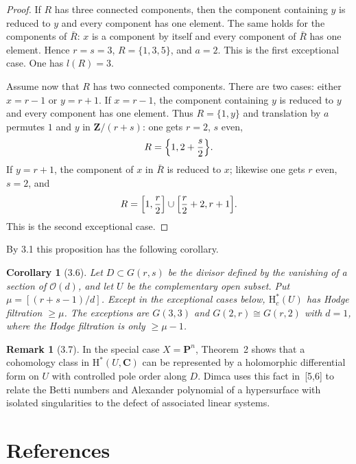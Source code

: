 \documentclass[11pt]{amsart}
\newtheorem{corollary}[theorem]{Corollary}
\theoremstyle{definition}
\newtheorem{remark}[theorem]{Remark}
\begin{document}
\begin{proof}
If $R$ has three connected components, then the component containing $y$ is reduced to $y$ and every component has one element. The same holds for the components of $\bar R$: $x$ is a component by itself and every component of $\bar R$ has one element. Hence $r=s=3$, $R=\{1,3,5\}$, and $a=2$. This is the first exceptional case. One has $l(R)=3$.

Assume now that $R$ has two connected components. There are two cases: either $x=r-1$ or $y=r+1$. If $x=r-1$, the component containing $y$ is reduced to $y$ and every component has one element. Thus $R=\{1,y\}$ and translation by $a$ permutes $1$ and $y$ in $\mathbf Z/(r+s)$: one gets $r=2$, $s$ even,
\[
R=\Bigl\{1, 2+\frac{s}{2}\Bigr\}.
\]
If $y=r+1$, the component of $x$ in $\bar R$ is reduced to $x$; likewise one gets $r$ even, $s=2$, and
\[
R=\Bigl[1,\frac r2\Bigr]\cup \Bigl[\frac r2+2, r+1\Bigr].
\]
This is the second exceptional case.
\end{proof}

By 3.1 this proposition has the following corollary.

\begin{corollary}[3.6]
Let $D\subset G(r,s)$ be the divisor defined by the vanishing of a section of $\mathscr O(d)$, and let $U$ be the complementary open subset. Put $\mu=[(r+s-1)/d]$. Except in the exceptional cases below, $\mathrm H_c^*(U)$ has Hodge filtration $\ge \mu$. The exceptions are $G(3,3)$ and $G(2,r)\cong G(r,2)$ with $d=1$, where the Hodge filtration is only $\ge \mu-1$.
\end{corollary}

\begin{remark}[3.7]
In the special case $X=\mathbf P^n$, Theorem~2 shows that a cohomology class in $\mathrm H^*(U,\mathbf C)$ can be represented by a holomorphic differential form on $U$ with controlled pole order along $D$. Dimca uses this fact in~[5,6] to relate the Betti numbers and Alexander polynomial of a hypersurface with isolated singularities to the defect of associated linear systems.
\end{remark}

\section*{References}
\end{document}
